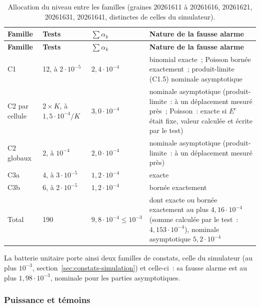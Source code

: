\documentclass[a4paper,11pt]{article}
\begin{document}
{\small
{}
\begin{longtable}{@{}p{4.6cm}p{2.4cm}p{2.8cm}p{4.6cm}@{}}
\caption{Allocation du niveau entre les familles (graines 20261611 à
20261616, 20261621, 20261631, 20261641, distinctes de celles du
simulateur).}
\label{tab:constats-familles}\\
\rowcolor{tableheader}
\textcolor{financeblue}{\textbf{Famille}} &
\textcolor{financeblue}{\textbf{Tests}} &
\textcolor{financeblue}{\textbf{$\sum \alpha_k$}} &
\textcolor{financeblue}{\textbf{Nature de la fausse alarme}} \\
\endfirsthead
\rowcolor{tableheader}
\textcolor{financeblue}{\textbf{Famille}} &
\textcolor{financeblue}{\textbf{Tests}} &
\textcolor{financeblue}{\textbf{$\sum \alpha_k$}} &
\textcolor{financeblue}{\textbf{Nature de la fausse alarme}} \\
\endhead
C1 & 12, à $2 \cdot 10^{-5}$ & $2{,}4 \cdot 10^{-4}$ & binomial exacte~; Poisson bornée exactement~; produit-limite (C1.5) nominale asymptotique \\
C2 par cellule & $2 \times K$, à $1{,}5 \cdot 10^{-4}/K$ & $3{,}0 \cdot 10^{-4}$ & nominale asymptotique (produit-limite~: à un déplacement mesuré près~; Poisson~: exacte si $E^c$ était fixe, valeur calculée et écrite par le test) \\
C2 globaux & 2, à $10^{-4}$ & $2{,}0 \cdot 10^{-4}$ & nominale asymptotique (produit-limite~: à un déplacement mesuré près) \\
C3a & 4, à $3 \cdot 10^{-5}$ & $1{,}2 \cdot 10^{-4}$ & exacte \\
C3b & 6, à $2 \cdot 10^{-5}$ & $1{,}2 \cdot 10^{-4}$ & bornée exactement \\
Total & 190 & $9{,}8 \cdot 10^{-4} \le 10^{-3}$ & dont exacte ou bornée exactement au plus $4{,}16 \cdot 10^{-4}$ (somme calculée par le test~: $4{,}153 \cdot 10^{-4}$), nominale asymptotique $5{,}2 \cdot 10^{-4}$ \\
\end{longtable}
}

\noindent
La batterie unitaire porte ainsi deux familles de constats, celle du
simulateur (au plus $10^{-3}$, section~\ref{sec:constats-simulation}) et
celle-ci~: sa fausse alarme est au plus $1{,}98 \cdot 10^{-3}$, nominale pour
les parties asymptotiques.

\subsubsection*{Puissance et témoins}
\end{document}
